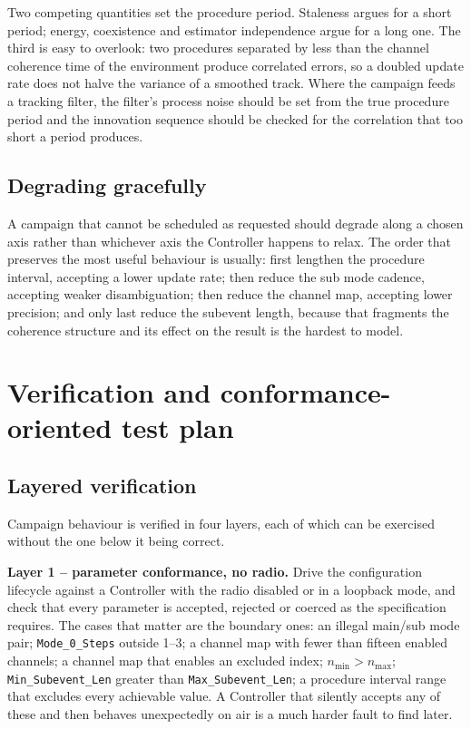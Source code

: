 \documentclass[11pt,a4paper]{article}
\newcommand{\code}[1]{\texttt{\small #1}}
\begin{document}
Two competing quantities set the procedure period. Staleness argues for a short period; energy,
coexistence and estimator independence argue for a long one. The third is easy to overlook: two
procedures separated by less than the channel coherence time of the environment produce correlated
errors, so a doubled update rate does not halve the variance of a smoothed track. Where the campaign
feeds a tracking filter, the filter's process noise should be set from the true procedure period and
the innovation sequence should be checked for the correlation that too short a period produces.

\subsection{Degrading gracefully}

A campaign that cannot be scheduled as requested should degrade along a chosen axis rather than
whichever axis the Controller happens to relax. The order that preserves the most useful behaviour is
usually: first lengthen the procedure interval, accepting a lower update rate; then reduce the sub
mode cadence, accepting weaker disambiguation; then reduce the channel map, accepting lower
precision; and only last reduce the subevent length, because that fragments the coherence structure
and its effect on the result is the hardest to model.

\section{Verification and conformance-oriented test plan}
\label{sec:verify}

\subsection{Layered verification}

Campaign behaviour is verified in four layers, each of which can be exercised without the one below
it being correct.

\textbf{Layer 1 -- parameter conformance, no radio.} Drive the configuration lifecycle against a
Controller with the radio disabled or in a loopback mode, and check that every parameter is accepted,
rejected or coerced as the specification requires. The cases that matter are the boundary ones: an
illegal main/sub mode pair; \code{Mode\_0\_Steps} outside 1--3; a channel map with fewer than fifteen
enabled channels; a channel map that enables an excluded index; $n_{\min} > n_{\max}$;
\code{Min\_Subevent\_Len} greater than \code{Max\_Subevent\_Len}; a procedure interval range that
excludes every achievable value. A Controller that silently accepts any of these and then behaves
unexpectedly on air is a much harder fault to find later.
\end{document}
